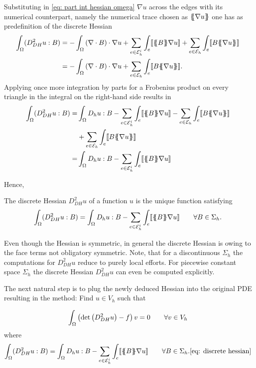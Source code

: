 Substituting in \eqref{eq: part int hessian omega} $\nabla u$ across the edges with its numerical counterpart, namely the numerical trace chosen as $\{\!\!\{ \nabla u \}\!\!\}$ one has as predefinition of the discrete Hessian
	\begin{align}
		\int_\Omega (D_{DH}^2 u : B) 
		&= - \int_\Omega \left(\nabla \cdot B\right) \cdot \nabla u
		+ \sum_{ e \in \edgesi} \int_e  \jump {\average B \nabla u } 
				+ \sum_{ e \in \edges} \int_e \jump {B \average {\nabla u} }  \nonumber \\
		&= - \int_\Omega \left(\nabla \cdot B\right) \cdot \nabla u
				+ \sum_{ e \in \edges} \int_e  \jump{B \average {\nabla u} }.	
	\end{align}
Applying once more integration by parts for a Frobenius product on every triangle in the integral on the right-hand side results in
	\begin{align}
		\int_\Omega (D_{DH}^2 u : B) 
		=& \int_\Omega D_h u: B 
			-\sum_{ e \in \edgesi} \int_e  \jump {\average B  \nabla u }
			- \sum_{ e \in \edges} \int_e \jump {B \average {\nabla u} }\nonumber \\		
			&+ \sum_{ e \in \edges} \int_e  \jump {B \average {\nabla u} }		\nonumber \\
		=& \int_\Omega D_h u: B -\sum_{ e \in \edgesi} \int_e  \jump {\average B  \nabla u }				
	\end{align}

Hence,
\begin{definition}
	The discrete Hessian $D_{DH}^2 u$ of a function $u$ is the unique function satisfying
	\begin{align}
		\int_\Omega (D_{DH}^2 u : B) 
		= \int_\Omega D_h u: B -\sum_{ e \in \mathcal{E}_h^i} \int_e  \llbracket \{\!\!\{ B \}\!\!\} \nabla u  \rrbracket\qquad \forall B \in \Sigma_h. \label{eq: discrete hessian}
	\end{align}
\end{definition}

Even though the Hessian is symmetric, in general the discrete Hessian is owing to the face terms not obligatory symmetric. 
Note, that for a discontinuous $\Sigma_h$ the computations for $D_{DH}^2 u$ reduce to purely local efforts. For piecewise constant space $\Sigma_h$ the discrete Hessian $D_{DH}^2 u$ can even be computed explicitly.

The next natural step is to plug the newly deduced Hessian into the original \MA PDE resulting in the method: Find $u \in V_h$ such that

\begin{align}
		\int_\Omega \left(\det{\left(D_{DH}^2 u\right)} - f \right) v = 0 \qquad \forall v \in V_h
\end{align}
where
	\begin{align}
		\int_\Omega (D_{DH}^2 u : B) 
		= \int_\Omega D_h u: B -\sum_{ e \in \mathcal{E}_h^i} \int_e  \llbracket \{\!\!\{ B \}\!\!\} \nabla u  \rrbracket\qquad \forall B \in \Sigma_h. \eqref{eq: discrete hessian}
	\end{align}

